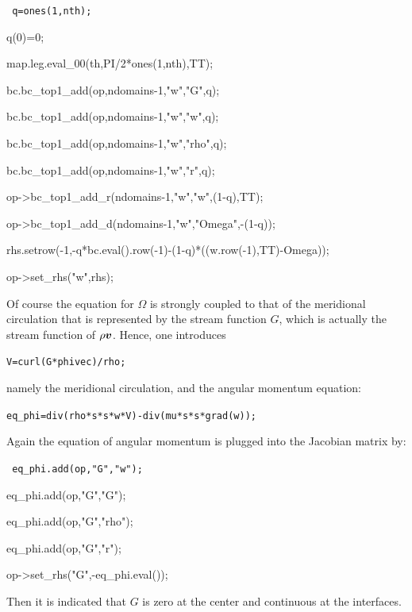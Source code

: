 \bigskip
\begin{center}
{\tt
        q=ones(1,nth);  \par
        q(0)=0;  \par
        map.leg.eval\_00(th,PI/2*ones(1,nth),TT);  \par
        bc.bc\_top1\_add(op,ndomains-1,"w","G",q);  \par
        bc.bc\_top1\_add(op,ndomains-1,"w","w",q);  \par
        bc.bc\_top1\_add(op,ndomains-1,"w","rho",q);  \par
        bc.bc\_top1\_add(op,ndomains-1,"w","r",q);  \par
        op->bc\_top1\_add\_r(ndomains-1,"w","w",(1-q),TT);  \par
        op->bc\_top1\_add\_d(ndomains-1,"w","Omega",-(1-q));  \par
        rhs.setrow(-1,-q*bc.eval().row(-1)-(1-q)*((w.row(-1),TT)-Omega));  \par
        op->set\_rhs("w",rhs);  \par
}
\end{center}

Of course the equation for $\Omega$ is strongly coupled to that of the
meridional circulation that is represented by the stream function $G$,
which is actually the stream function of $\rho\vv$. Hence, one introduces

\centerline{\tt V=curl(G*phivec)/rho;}
\bigskip
\noindent namely the meridional circulation, and the angular momentum equation:

\bigskip
\centerline{\tt  eq\_phi=div(rho*s*s*w*V)-div(mu*s*s*grad(w));}
\bigskip

Again the equation of angular momentum is plugged into the Jacobian
matrix by:

\bigskip
\begin{center}
{\tt
        eq\_phi.add(op,"G","w");  \par
        eq\_phi.add(op,"G","G");  \par
        eq\_phi.add(op,"G","rho");  \par
        eq\_phi.add(op,"G","r");  \par
        op->set\_rhs("G",-eq\_phi.eval());  \par
}
\end{center}
\bigskip
Then it is indicated that $G$ is zero at the center and continuous at
the interfaces.







